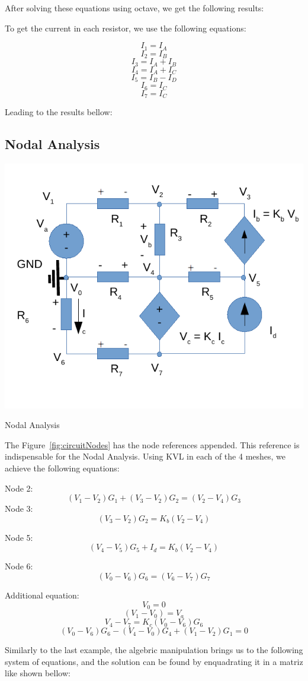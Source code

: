After solving these equations using octave, we get 
the following results:


To get the current in each resistor, we use the following equations:

$$ I_1 = I_A $$
$$ I_2 = I_B $$
$$ I_3 = I_A + I_B $$
$$ I_4 = I_A + I_C $$
$$ I_5 = I_B - I_D $$
$$ I_6 = I_C $$
$$ I_7 = I_C $$

Leading to the results bellow:


\subsection{Nodal Analysis}

\begin{figures}
	\includegraphics[width=0.4\linewidth]{circ_node.pdf}
	\caption{Nodal Analysis}
	\label{fig:circuitNodes}
\end{figures}

The Figure~\ref{fig:circuitNodes} has the node references appended.
This reference is indispensable for the Nodal Analysis.
Using KVL in each of the 4 meshes, we achieve the following equations:

Node 2:
$$ (V_1 - V_2)G_1 + (V_3 - V_2)G_2 = (V_2 - V_4)G_3 $$
Node 3:
$$ (V_3 - V_2)G_2 = K_b(V_2 - V_4) $$

Node 5:
$$ (V_4 - V_5)G_5 + I_d = K_b(V_2 - V_4) $$

Node 6:
$$ (V_0 - V_6)G_6 = (V_6 - V_7)G_7 $$

Additional equation:
$$ V_0 = 0 $$
$$ (V_1 - V_0) = V_a $$
$$ V_4 - V_7 = K_c(V_0 - V_6)G_6$$
$$ (V_0 -V_6)G_6 - (V_4 - V_0)G_4 + (V_1 - V_2)G_1 = 0 $$

Similarly to the last example, the algebric manipulation brings us to the following system of equations, 
and the solution can be found by enquadrating it in a matriz like shown bellow:

